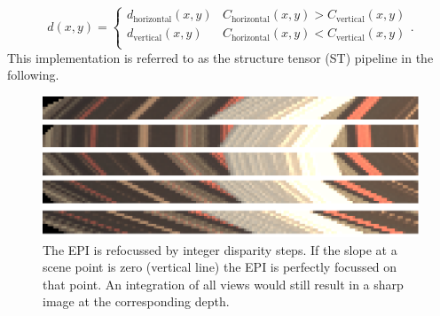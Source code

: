 \documentclass  [
  paper    = a4,
  BCOR     = 10mm,
  twoside,
  fontsize = 12pt,
  fleqn,
  toc      = bibnumbered,
  toc      = listofnumbered,
  numbers  = noendperiod,
  headings = normal,
  listof   = leveldown,
  version  = 3.03
]                                       {scrreprt}
\begin{document}
 \begin{equation}\label{key}
 d(x,y) = \begin{cases} d_\text{horizontal}(x,y) & C_\text{horizontal}(x,y)>C_\text{vertical}(x,y)\\
 						d_\text{vertical}(x,y) & C_\text{horizontal}(x,y)<C_\text{vertical}(x,y)\\
 		\end{cases}.
 \end{equation} 
 This implementation is referred to as the structure tensor (ST) pipeline in the following.
  \begin{figure}[h!]
 	\centering
 	\includegraphics[width=0.7\linewidth]{images/refocused_cut}
 	\caption[Refocussed EPI]{The EPI is refocussed by integer disparity steps. If the slope at a scene point is zero (vertical line) the EPI is perfectly focussed on that point. An integration of all views would still result in a sharp image at the corresponding depth.}
 	\label{fig:refocusedcut}
 \end{figure}
\end{document}
